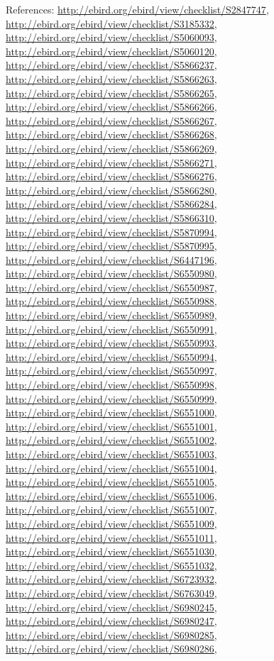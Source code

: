 \documentclass[9pt, article]{memoir}
\begin{document}
\begin{multicols}{2}
\vspace{6pt}References: 
\url{http://ebird.org/ebird/view/checklist/S2847747}, 
\url{http://ebird.org/ebird/view/checklist/S3185332}, 
\url{http://ebird.org/ebird/view/checklist/S5060093}, 
\url{http://ebird.org/ebird/view/checklist/S5060120}, 
\url{http://ebird.org/ebird/view/checklist/S5866237}, 
\url{http://ebird.org/ebird/view/checklist/S5866263}, 
\url{http://ebird.org/ebird/view/checklist/S5866265}, 
\url{http://ebird.org/ebird/view/checklist/S5866266}, 
\url{http://ebird.org/ebird/view/checklist/S5866267}, 
\url{http://ebird.org/ebird/view/checklist/S5866268}, 
\url{http://ebird.org/ebird/view/checklist/S5866269}, 
\url{http://ebird.org/ebird/view/checklist/S5866271}, 
\url{http://ebird.org/ebird/view/checklist/S5866276}, 
\url{http://ebird.org/ebird/view/checklist/S5866280}, 
\url{http://ebird.org/ebird/view/checklist/S5866284}, 
\url{http://ebird.org/ebird/view/checklist/S5866310}, 
\url{http://ebird.org/ebird/view/checklist/S5870994}, 
\url{http://ebird.org/ebird/view/checklist/S5870995}, 
\url{http://ebird.org/ebird/view/checklist/S6447196}, 
\url{http://ebird.org/ebird/view/checklist/S6550980}, 
\url{http://ebird.org/ebird/view/checklist/S6550987}, 
\url{http://ebird.org/ebird/view/checklist/S6550988}, 
\url{http://ebird.org/ebird/view/checklist/S6550989}, 
\url{http://ebird.org/ebird/view/checklist/S6550991}, 
\url{http://ebird.org/ebird/view/checklist/S6550993}, 
\url{http://ebird.org/ebird/view/checklist/S6550994}, 
\url{http://ebird.org/ebird/view/checklist/S6550997}, 
\url{http://ebird.org/ebird/view/checklist/S6550998}, 
\url{http://ebird.org/ebird/view/checklist/S6550999}, 
\url{http://ebird.org/ebird/view/checklist/S6551000}, 
\url{http://ebird.org/ebird/view/checklist/S6551001}, 
\url{http://ebird.org/ebird/view/checklist/S6551002}, 
\url{http://ebird.org/ebird/view/checklist/S6551003}, 
\url{http://ebird.org/ebird/view/checklist/S6551004}, 
\url{http://ebird.org/ebird/view/checklist/S6551005}, 
\url{http://ebird.org/ebird/view/checklist/S6551006}, 
\url{http://ebird.org/ebird/view/checklist/S6551007}, 
\url{http://ebird.org/ebird/view/checklist/S6551009}, 
\url{http://ebird.org/ebird/view/checklist/S6551011}, 
\url{http://ebird.org/ebird/view/checklist/S6551030}, 
\url{http://ebird.org/ebird/view/checklist/S6551032}, 
\url{http://ebird.org/ebird/view/checklist/S6723932}, 
\url{http://ebird.org/ebird/view/checklist/S6763049}, 
\url{http://ebird.org/ebird/view/checklist/S6980245}, 
\url{http://ebird.org/ebird/view/checklist/S6980247}, 
\url{http://ebird.org/ebird/view/checklist/S6980285}, 
\url{http://ebird.org/ebird/view/checklist/S6980286}, 

\end{multicols}
\end{document}

